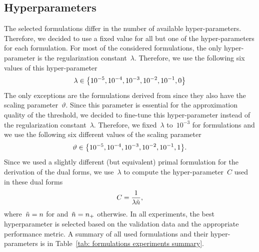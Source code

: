 \pagebreak

\subsection{Hyperparameters}

The selected formulations differ in the number of available hyper-parameters. Therefore, we decided to use a fixed value for all but one of the hyper-parameters for each formulation. For most of the considered formulations, the only hyper-parameter is the regularization constant~$\lambda$. Therefore, we use the following six values of this hyper-parameter
\begin{equation*}
  \lambda \in \Brac[c]{10^{-5}, 10^{-4}, 10^{-3}, 10^{-2}, 10^{-1}, 0}
\end{equation*}
The only exceptions are the formulations derived from \PatMatNP since they also have the scaling parameter~$\vartheta.$ Since this parameter is essential for the approximation quality of the threshold, we decided to fine-tune this hyper-parameter instead of the regularization constant~$\lambda$. Therefore, we fixed~$\lambda$ to~$10^{-3}$ for \PatMatNP formulations and we use the following six different values of the scaling parameter
\begin{equation*}
  \vartheta \in \Brac[c]{10^{-5}, 10^{-4}, 10^{-3}, 10^{-2}, 10^{-1}, 1}.
\end{equation*}
Since we used a slightly different (but equivalent) primal formulation for the derivation of the dual forms, we use~$\lambda$ to compute the hyper-parameter~$C$ used in these dual forms
\begin{equation*}
  C = \frac{1}{\lambda \tilde{n}},
\end{equation*}
where~$\tilde{n} = n$ for \SVM and~$\tilde{n} = n_{+}$ otherwise. In all experiments, the best hyperparameter is selected based on the validation data and the appropriate performance metric. A summary of all used formulations and their hyper-parameters is in Table~\ref{tab: formulations experiments summary}.

